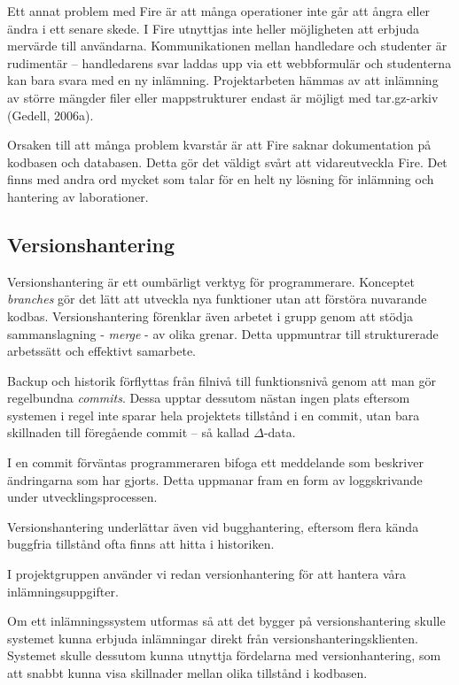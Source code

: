 Ett annat problem med Fire är att många operationer inte går att ångra eller ändra i ett senare skede. 
I Fire utnyttjas inte heller möjligheten att erbjuda mervärde till användarna. Kommunikationen mellan handledare och studenter är rudimentär – handledarens svar laddas upp via ett webbformulär och studenterna kan bara svara med en ny inlämning. Projektarbeten hämmas av att inlämning av större mängder filer eller mappstrukturer endast är möjligt med tar.gz-arkiv (Gedell, 2006a).

Orsaken till att många problem kvarstår är att Fire saknar dokumentation på kodbasen och databasen. Detta gör det väldigt svårt att vidareutveckla Fire.
Det finns med andra ord mycket som talar för en helt ny lösning för inlämning och hantering av laborationer.

\subsection{Versionshantering}

Versionshantering är ett oumbärligt verktyg för programmerare. Konceptet \emph{branches} gör det lätt att utveckla nya funktioner utan att förstöra nuvarande kodbas. Versionshantering förenklar även arbetet i grupp genom att stödja sammanslagning - \emph{merge} - av olika grenar. Detta uppmuntrar till strukturerade arbetssätt och effektivt samarbete. 

Backup och historik förflyttas från filnivå till funktionsnivå genom att man gör regelbundna \emph{commits}. Dessa upptar dessutom nästan ingen plats eftersom systemen i regel inte sparar hela projektets tillstånd i en commit, utan bara skillnaden till föregående commit – så kallad $\Delta$-data.

I en commit förväntas programmeraren bifoga ett meddelande som beskriver ändringarna som har gjorts. Detta uppmanar fram en form av loggskrivande under utvecklingsprocessen.

Versionshantering underlättar även vid bugghantering, eftersom flera kända buggfria tillstånd ofta finns att hitta i historiken.

I projektgruppen använder vi redan versionhantering för att hantera våra inlämningsuppgifter.

Om ett inlämningssystem utformas så att det bygger på versionshantering skulle systemet kunna erbjuda inlämningar direkt från versionshanteringsklienten. Systemet skulle dessutom kunna utnyttja fördelarna med versionhantering, som att snabbt kunna visa skillnader mellan olika tillstånd i kodbasen.

